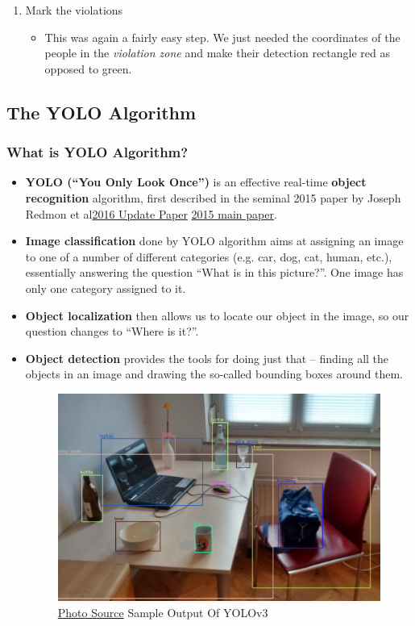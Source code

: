\documentclass[a4paper]{article}
\begin{document}
\begin{enumerate}
    \item Mark the violations
          \begin{itemize}[label={}]
              \item This was again a fairly easy step. We just needed the coordinates of the people in the \textit{violation zone} and make their detection rectangle red as opposed to green.
          \end{itemize}
\end{enumerate}

\subsection{The YOLO Algorithm}

\subsubsection{What is YOLO Algorithm?}

\begin{itemize}
    \item \textbf{YOLO (“You Only Look Once”)} is an effective real-time \textbf{object recognition} algorithm, first described in the seminal 2015 paper by Joseph Redmon et al\textcolor{green}{\href{https://arxiv.org/abs/1804.02767}{2016 Update Paper}} \textcolor{green}{\href{https://arxiv.org/abs/1506.02640}{2015 main paper}}.
    \item \textbf{Image classification} done by YOLO algorithm aims at assigning an image to one of a number of different categories (e.g. car, dog, cat, human, etc.), essentially answering the question “What is in this picture?”. One image has only one category assigned to it.
    \item \textbf{Object localization} then allows us to locate our object in the image, so our question changes to “Where is it?”.
    \item \textbf{Object detection} provides the tools for doing just that –  finding all the objects in an image and drawing the so-called bounding boxes around them.
    \begin{figure}[h!]
        \centering
        \includegraphics[width=0.5\linewidth]{Pictures/Detected-with-YOLO--Schreibtisch-mit-Objekten.jpg}
        \caption{\textcolor{green}{\href{https://en.wikipedia.org/wiki/Object_detection}{Photo Source}} Sample Output Of YOLOv3}
    \end{figure}
\end{itemize}
\end{document}
